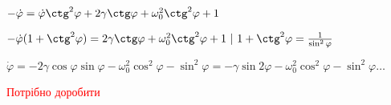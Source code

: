 $-\dot{\varphi} = \dot{\varphi} \ctg^2 \varphi + 2\gamma\ctg \varphi + \omega_0^2 \ctg^2 \varphi + 1$

$-\dot{\varphi}(1 + \ctg^2\varphi) =  2\gamma\ctg \varphi + \omega_0^2 \ctg^2\varphi + 1\ | \ 1+\ctg^2\varphi = \frac{1}{\sin^2\varphi}$ 

$\dot{\varphi} = -2\gamma\cos\varphi\sin\varphi - \omega^2_0\cos^2\varphi - \sin^2\varphi= 
-\gamma\sin 2\varphi - \omega_0^2\cos^2\varphi - \sin^2\varphi \ldots$ 

\textcolor{red}{Потрібно доробити}
